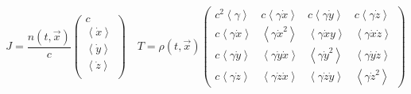 \[
  J= \frac{n(t,\vec{x})}{c}
  \begin{pmatrix}
    c \\
    \left< \dot{x} \right> \\
    \left< \dot{y} \right> \\
    \left< \dot{z} \right> \\
  \end{pmatrix}\quad
  T= \rho(t,\vec{x})
  \begin{pmatrix}
    c^2 \left< \gamma \right> & c \left< \gamma \dot{x} \right> &  c \left< \gamma \dot{y} \right> & c \left< \gamma \dot{z} \right> \\
     c \left< \gamma \dot{x} \right> & \left< \gamma \dot{x}^2 \right> &  \left< \gamma \dot{x}y \right> &  \left< \gamma \dot{x} \dot{z} \right>  \\
     c \left< \gamma \dot{y} \right> &  \left< \gamma \dot{y} \dot{x} \right>&  \left< \gamma \dot{y}^2 \right> &  \left< \gamma \dot{y} \dot{z} \right>  \\
     c \left< \gamma \dot{z} \right> &  \left< \gamma \dot{z}\dot{x} \right>& \left< \gamma \dot{z}\dot{y} \right> &  \left< \gamma \dot{z}^2 \right> 
  \end{pmatrix}
\]

